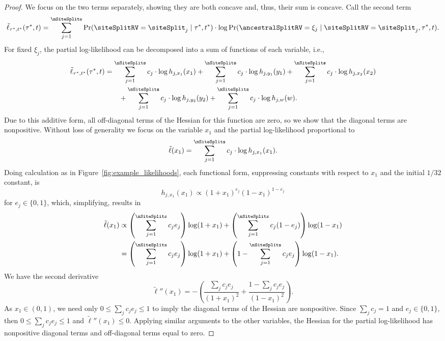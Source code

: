 \begin{proof}
We focus on the two terms separately, showing they are both concave and, thus, their sum is concave.
Call the second term
\[
\tilde{\ell}_{\tau^*,t^*}(\tau^*, t) = \sum_{j=1}^\nSiteSplits \Pr(\siteSplitRV=\siteSplit_j \mid \tau^*, t^*)\cdot\log \Pr(\ancestralSplitRV=\xi_j \mid \siteSplitRV = \siteSplit_j, \tau^*, t).
\]
For fixed $\xi_j$, the partial log-likelihood can be decomposed into a sum of functions of each variable, i.e.,
\begin{align*}
\tilde{\ell}_{\tau^*,t^*}(\tau^*, t) &= \sum_{j=1}^\nSiteSplits c_j\cdot\log h_{j,x_1}(x_1)+\sum_{j=1}^\nSiteSplits c_j\cdot\log h_{j,y_1}(y_1)+\sum_{j=1}^\nSiteSplits c_j\cdot\log h_{j,x_2}(x_2)\\
&\qquad + \sum_{j=1}^\nSiteSplits c_j\cdot\log h_{j,y_2}(y_2)+\sum_{j=1}^\nSiteSplits c_j\cdot\log h_{j,w}(w).
\end{align*}
Due to this additive form, all off-diagonal terms of the Hessian for this function are zero, so we show that the diagonal terms are nonpositive.
Without loss of generality we focus on the variable $x_1$ and the partial log-likelihood proportional to
\[
\tilde{\ell}(x_1) = \sum_{j=1}^\nSiteSplits c_j\cdot\log h_{j,x_1}(x_1).
\]
Doing calculation as in Figure~\ref{fig:example_likelihoods}, each functional form, suppressing constants with respect to $x_1$ and the initial $1/32$ constant, is
\[
h_{j,x_1}(x_1) \propto (1+x_1)^{e_j}(1-x_1)^{1-e_j}
\]
for $e_j\in\{0,1\}$, which, simplifying, results in
\begin{align}
\tilde{\ell}(x_1) &\propto \left(\sum_{j=1}^\nSiteSplits c_je_j\right) \log(1+x_1) + \left(\sum_{j=1}^\nSiteSplits c_j(1-e_j)\right) \log (1-x_1)\\
                  &= \left(\sum_{j=1}^\nSiteSplits c_je_j\right) \log(1+x_1) + \left(1-\sum_{j=1}^\nSiteSplits c_je_j\right) \log (1-x_1). \label{eq:partial-x-form}
\end{align}
We have the second derivative
\[
\tilde{\ell}''(x_1) = -\left(\frac{\sum_j c_je_j}{(1+x_1)^2}+\frac{1-\sum_j c_je_j}{(1-x_1)^2}\right).
\]
As $x_1\in(0,1)$, we need only $0 \le \sum_j c_je_j \le 1$ to imply the diagonal terms of the Hessian are nonpositive.
Since $\sum_j c_j = 1$ and $e_j\in\{0,1\}$, then $0 \le \sum_j c_je_j \le 1$ and $\tilde{\ell}''(x_1) \le 0$.
Applying similar arguments to the other variables, the Hessian for the partial log-likelihood has nonpositive diagonal terms and off-diagonal terms equal to zero.


\end{proof}
